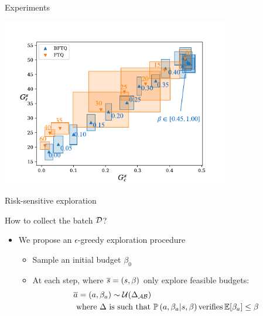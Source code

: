 \documentclass[french,handout]{beamer}
\begin{document}
    \begin{frame}{Experiments}
        \begin{center}
            \includegraphics[width=0.75\textwidth]{img/slot-filling.pdf}
        \end{center}
    \end{frame}

    \begin{frame}{Risk-sensitive exploration}

        How to collect the batch $\mathcal{D}$?

        \begin{itemize}
            \item We propose an $\epsilon$-greedy exploration procedure
            \begin{itemize}
                \pause\item Sample an initial budget $\beta_0$
                \pause\item At each step, where $\overline{s}=(s,\beta)$ only explore feasible budgets:
                \pause\begin{align*}
                          &\overline{a} = (a, \beta_a)\sim\mathcal{U}(\Delta_{\mathcal{A}\mathcal{B}})\\
                          &\text{ where }  \Delta \text{ is such that }\mathbb{P}\left(a, \beta_a|s, \beta\right) \text{verifies} \operatorname*{\mathbb{E}}[\beta_a]\leq\beta
                \end{align*}
            \end{itemize}
        \end{itemize}


    \end{frame}
\end{document}
